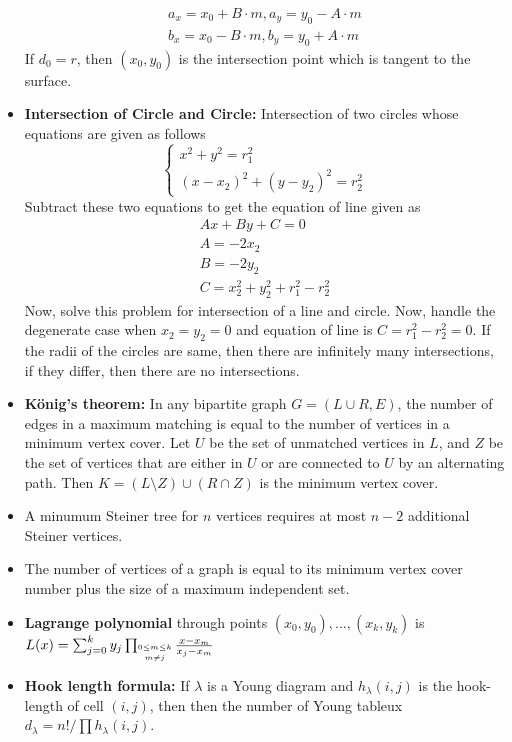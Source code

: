 \documentclass[12pt,a4paper,landscape]{amsart}
\begin{document}
\begin{multicols*}{3}
\begin{itemize}
		\begin{gather*}
			a_x = x_0 + B \cdot m, a_y = y_0 - A  \cdot m\\
			b_x = x_0 - B\cdot m, b_y = y_0 + A\cdot m
		\end{gather*}
	If $d_0 = r$, then $(x_0, y_0)$ is the intersection point which is tangent to the surface.
	\item \textbf{Intersection of Circle and Circle:} Intersection of two circles whose equations are given as follows
		\begin{equation*}
				\begin{cases*}
					x^2 + y^2 = r_1^2\\
					(x - x_2)^2 + (y - y_2)^2 = r_2^2
				\end{cases*}
		\end{equation*}
		Subtract these two equations to get the equation of line given as
		\begin{gather*}
			Ax + By + C = 0\\
			A = -2x_2\\
			B = -2y_2\\
			C = x_2^2 + y_2^2 + r_1^2 - r_2^2
		\end{gather*}
	Now, solve this problem for intersection of a line and circle.
	Now, handle the degenerate case when $x_2 = y_2 = 0$ and equation of line is $C = r_1^2 - r_2^2 = 0$. If the radii of the circles are same, then there are infinitely many intersections, if they differ, then there are no intersections.
	\item \textbf{König's theorem:} In any bipartite graph $G=(L\cup R,E)$, the number
	of edges in a maximum matching is equal to the number of
	vertices in a minimum vertex cover. Let $U$ be the set of
	unmatched vertices in $L$, and $Z$ be the set of vertices that
	are either in $U$ or are connected to $U$ by an alternating
	path. Then $K=(L\setminus Z)\cup(R\cap Z)$ is the minimum
	vertex cover.
	\item A minumum Steiner tree for $n$ vertices requires at most $n-2$ additional Steiner vertices.
	\item The number of vertices of a graph is equal to its minimum
	vertex cover number plus the size of a maximum independent set.
	\item \textbf{Lagrange polynomial} through points $(x_0,y_0),\ldots,(x_k,y_k)$ is $L(x) = \sum_{j=0}^k y_j \prod_{\shortstack{$\scriptscriptstyle 0\leq m \leq k$ \\ $\scriptscriptstyle m\neq j$}} \frac{x-x_m}{x_j - x_m}$
	\item \textbf{Hook length formula:} If $\lambda$ is a Young diagram and $h_{\lambda}(i,j)$ is the hook-length of cell $(i,j)$, then then the number of Young tableux $d_{\lambda} = n!/\prod h_{\lambda}(i,j)$.

\end{itemize}
\end{multicols*}
\end{document}
